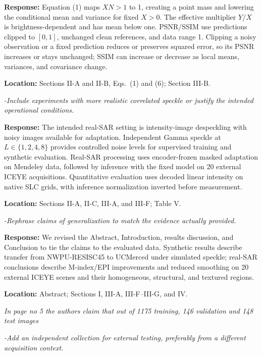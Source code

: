 \documentclass[11pt,letterpaper]{article}
\newcommand{\reviewgroup}[1]{%
  \Needspace{5\baselineskip}%
  \medskip\textit{#1}\par
}
\begin{document}
\textbf{Response:} Equation (1) maps \(XN>1\) to 1, creating a point mass and lowering the conditional mean and variance for fixed \(X>0\). The effective multiplier \(Y/X\) is brightness-dependent and has mean below one. PSNR/SSIM use predictions clipped to \([0,1]\), unchanged clean references, and data range 1. Clipping a noisy observation or a fixed prediction reduces or preserves squared error, so its PSNR increases or stays unchanged; SSIM can increase or decrease as local means, variances, and covariance change.

\textbf{Location:} Sections II-A and II-B, Eqs.~(1) and (6); Section III-B.

\textit{-Include experiments with more realistic correlated speckle or justify the intended operational conditions.}

\textbf{Response:} The intended real-SAR setting is intensity-image despeckling with noisy images available for adaptation. Independent Gamma speckle at \(L\in\{1,2,4,8\}\) provides controlled noise levels for supervised training and synthetic evaluation. Real-SAR processing uses encoder-frozen masked adaptation on Mendeley data, followed by inference with the fixed model on 20 external ICEYE acquisitions. Quantitative evaluation uses decoded linear intensity on native SLC grids, with inference normalization inverted before measurement.

\textbf{Location:} Sections II-A, II-C, III-A, and III-F; Table V.

\textit{-Rephrase claims of generalization to match the evidence actually provided.}

\textbf{Response:} We revised the Abstract, Introduction, results discussion, and Conclusion to tie the claims to the evaluated data. Synthetic results describe transfer from NWPU-RESISC45 to UCMerced under simulated speckle; real-SAR conclusions describe M-index/EPI improvements and reduced smoothing on 20 external ICEYE scenes and their homogeneous, structural, and textured regions.

\textbf{Location:} Abstract; Sections I, III-A, III-F--III-G, and IV.

\reviewgroup{In page no 5 the authors claim that out of 1175 training, 146 validation and 148 test images}

\textit{-Add an independent collection for external testing, preferably from a different acquisition context.}
\end{document}
